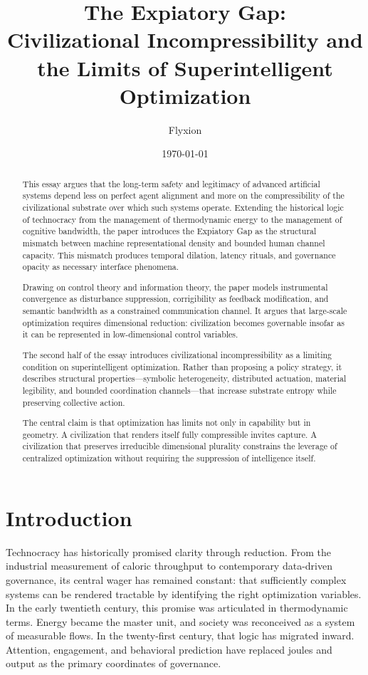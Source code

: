 \documentclass[12pt]{article}
\title{\textbf{The Expiatory Gap:\\
Civilizational Incompressibility and the Limits of Superintelligent Optimization}}
\author{Flyxion}
\date{\today}
\begin{document}
\maketitle

\begin{abstract}
This essay argues that the long-term safety and legitimacy of advanced artificial systems depend less on perfect agent alignment and more on the compressibility of the civilizational substrate over which such systems operate. Extending the historical logic of technocracy from the management of thermodynamic energy to the management of cognitive bandwidth, the paper introduces the Expiatory Gap as the structural mismatch between machine representational density and bounded human channel capacity. This mismatch produces temporal dilation, latency rituals, and governance opacity as necessary interface phenomena.

Drawing on control theory and information theory, the paper models instrumental convergence as disturbance suppression, corrigibility as feedback modification, and semantic bandwidth as a constrained communication channel. It argues that large-scale optimization requires dimensional reduction: civilization becomes governable insofar as it can be represented in low-dimensional control variables.

The second half of the essay introduces civilizational incompressibility as a limiting condition on superintelligent optimization. Rather than proposing a policy strategy, it describes structural properties—symbolic heterogeneity, distributed actuation, material legibility, and bounded coordination channels—that increase substrate entropy while preserving collective action. 

The central claim is that optimization has limits not only in capability but in geometry. A civilization that renders itself fully compressible invites capture. A civilization that preserves irreducible dimensional plurality constrains the leverage of centralized optimization without requiring the suppression of intelligence itself.
\end{abstract}

\newpage
\section{Introduction}

Technocracy has historically promised clarity through reduction. From the industrial measurement of caloric throughput to contemporary data-driven governance, its central wager has remained constant: that sufficiently complex systems can be rendered tractable by identifying the right optimization variables. In the early twentieth century, this promise was articulated in thermodynamic terms. Energy became the master unit, and society was reconceived as a system of measurable flows. In the twenty-first century, that logic has migrated inward. Attention, engagement, and behavioral prediction have replaced joules and output as the primary coordinates of governance.
\end{document}
